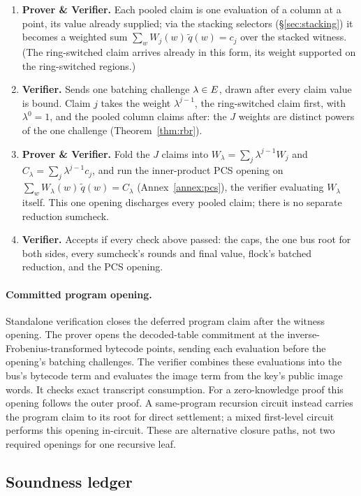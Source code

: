 \begin{enumerate}
\item \textbf{Prover \& Verifier.} Each pooled claim is one evaluation of a column at a point, its value already supplied; via the stacking selectors (\S\ref{sec:stacking}) it becomes a weighted sum $\sum_w W_j(w)\,\widetilde q(w)=c_j$ over the stacked witness. (The ring-switched claim arrives already in this form, its weight supported on the ring-switched regions.)
\item \textbf{Verifier.} Sends one batching challenge $\lambda\in E$, drawn after every claim value is bound. Claim $j$ takes the weight $\lambda^{j-1}$, the ring-switched claim first, with $\lambda^0=1$, and the pooled column claims after: the $J$ weights are distinct powers of the one challenge (Theorem~\ref{thm:rbr}).
\item \textbf{Prover \& Verifier.} Fold the $J$ claims into $W_\lambda=\sum_j\lambda^{j-1} W_j$ and $C_\lambda=\sum_j\lambda^{j-1} c_j$, and run the inner-product PCS opening on $\sum_w W_\lambda(w)\,\widetilde q(w)=C_\lambda$ (Annex~\ref{annex:pcs}), the verifier evaluating $W_\lambda$ itself. This one opening discharges every pooled claim; there is no separate reduction sumcheck.
\item \textbf{Verifier.} Accepts if every check above passed: the caps, the one bus root for both sides, every sumcheck's rounds and final value, flock's batched reduction, and the PCS opening.
\end{enumerate}

\paragraph{Committed program opening.}
Standalone verification closes the deferred program claim after the witness opening. The prover opens the decoded-table commitment at the inverse-Frobenius-transformed bytecode points, sending each evaluation before the opening's batching challenges. The verifier combines these evaluations into the bus's bytecode term and evaluates the image term from the key's public image words. It checks exact transcript consumption. For a zero-knowledge proof this opening follows the outer proof. A same-program recursion circuit instead carries the program claim to its root for direct settlement; a mixed first-level circuit performs this opening in-circuit. These are alternative closure paths, not two required openings for one recursive leaf.

\subsection{Soundness ledger}\label{sec:e2e-ledger}

